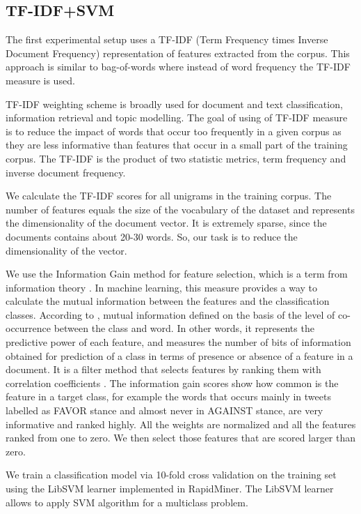 \documentclass[10pt, a4paper]{article}
\begin{document}
\subsection{TF-IDF+SVM}

The first experimental setup uses a TF-IDF (Term Frequency times Inverse Document Frequency) \cite{Jones72astatistical} representation of features extracted from the corpus. This approach is similar to bag-of-words where instead of word frequency the TF-IDF measure is used.

TF-IDF weighting scheme is broadly used for document and text classification, information retrieval and topic modelling. The goal of using of TF-IDF measure is to reduce the impact of words that occur too frequently in a given corpus as they are less informative than features that occur in a small part of the training corpus. The TF-IDF is the product of two statistic metrics, term frequency  and inverse document frequency.

We calculate the TF-IDF scores for all unigrams in the training corpus. The number of features equals the size of the vocabulary of the dataset and represents the dimensionality of the document vector. It is extremely sparse, since the documents contains about 20-30 words. So, our task is to reduce the dimensionality of the vector. 

We use the Information Gain method for feature selection, which is a term from information theory \cite{Cover:2006:EIT:1146355}. In machine learning, this measure provides a way to calculate the mutual information between the features and the classification classes. According to \cite{Aggarwal12}, mutual information defined on the basis of the level of co-occurrence between the class and word. In other words, it represents the predictive power of each feature, and measures the number of bits of information obtained for prediction of a class in terms of presence or absence of a feature in a document. It is a filter method that selects features by ranking them with correlation coefficients \cite{guyon03}. The information gain scores show how common is the feature in a target class, for example the words that occurs mainly in tweets labelled as FAVOR stance and almost never in AGAINST stance, are very informative and ranked highly. All the weights are normalized and all the features ranked from one to zero. We then select those features that are scored larger than zero.

We train a classification model via 10-fold cross validation on the training set using the LibSVM learner \cite{Fan2005} implemented in RapidMiner. The LibSVM learner allows to apply SVM algorithm for a multiclass problem. 
\end{document}
